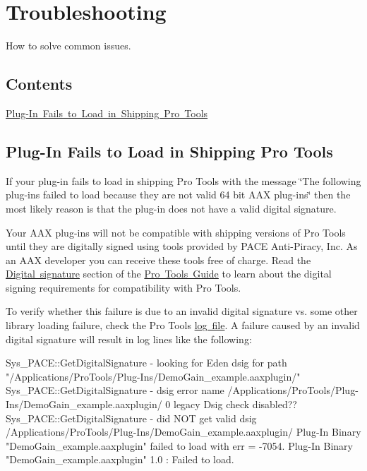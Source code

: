 \hypertarget{a00842}{}\section{Troubleshooting}
\label{a00842}
How to solve common issues. 

\hypertarget{a00842_troubleshooting_contents}{}\subsection{Contents}\label{a00842_troubleshooting_contents}
\begin{DoxyItemize}
\item \mbox{\hyperlink{a00842_troubleshooting_signature}{Plug-\/\+In Fails to Load in Shipping Pro Tools}}\end{DoxyItemize}
\hypertarget{a00842_troubleshooting_signature}{}\subsection{Plug-\/\+In Fails to Load in Shipping Pro Tools}\label{a00842_troubleshooting_signature}
If your plug-\/in fails to load in shipping Pro Tools with the message \char`\"{}\+The following plug-\/ins failed to load because they are not valid 64 bit A\+A\+X plug-\/ins\char`\"{} then the most likely reason is that the plug-\/in does not have a valid digital signature.

Your A\+AX plug-\/ins will not be compatible with shipping versions of Pro Tools until they are digitally signed using tools provided by P\+A\+CE Anti-\/\+Piracy, Inc. As an A\+AX developer you can receive these tools free of charge. Read the \mbox{\hyperlink{a00830_subsection__digital_signature_}{Digital signature}} section of the \mbox{\hyperlink{a00830}{Pro Tools Guide}} to learn about the digital signing requirements for compatibility with Pro Tools.

 

To verify whether this failure is due to an invalid digital signature vs. some other library loading failure, check the Pro Tools \mbox{\hyperlink{a00834}{log file}}. A failure caused by an invalid digital signature will result in log lines like the following\+:

\begin{DoxyVerb}Sys_PACE::GetDigitalSignature - looking for Eden dsig for path "/Applications/ProTools/Plug-Ins/DemoGain_example.aaxplugin/"
Sys_PACE::GetDigitalSignature - dsig error name /Applications/ProTools/Plug-Ins/DemoGain_example.aaxplugin/ 0 
legacy Dsig check disabled??
Sys_PACE::GetDigitalSignature - did NOT get valid dsig /Applications/ProTools/Plug-Ins/DemoGain_example.aaxplugin/
Plug-In Binary "DemoGain_example.aaxplugin" failed to load with err = -7054.
Plug-In Binary "DemoGain_example.aaxplugin" 1.0 : Failed to load.\end{DoxyVerb}


